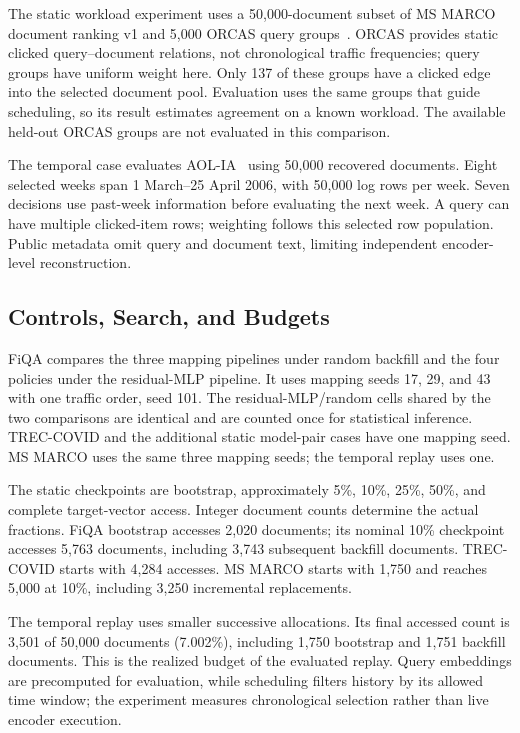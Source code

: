 \documentclass[runningheads]{llncs}
\begin{document}
The static workload experiment uses a 50,000-document subset of MS MARCO document ranking v1 and 5,000 ORCAS query groups~\cite{orcas}. ORCAS provides static clicked query--document relations, not chronological traffic frequencies; query groups have uniform weight here. Only 137 of these groups have a clicked edge into the selected document pool. Evaluation uses the same groups that guide scheduling, so its result estimates agreement on a known workload. The available held-out ORCAS groups are not evaluated in this comparison.

The temporal case evaluates AOL-IA~\cite{aol} using 50,000 recovered documents. Eight selected weeks span 1 March--25 April 2006, with 50,000 log rows per week. Seven decisions use past-week information before evaluating the next week. A query can have multiple clicked-item rows; weighting follows this selected row population. Public metadata omit query and document text, limiting independent encoder-level reconstruction.

\subsection{Controls, Search, and Budgets}

FiQA compares the three mapping pipelines under random backfill and the four policies under the residual-MLP pipeline. It uses mapping seeds 17, 29, and 43 with one traffic order, seed 101. The residual-MLP/random cells shared by the two comparisons are identical and are counted once for statistical inference. TREC-COVID and the additional static model-pair cases have one mapping seed. MS MARCO uses the same three mapping seeds; the temporal replay uses one.

The static checkpoints are bootstrap, approximately 5\%, 10\%, 25\%, 50\%, and complete target-vector access. Integer document counts determine the actual fractions. FiQA bootstrap accesses 2,020 documents; its nominal 10\% checkpoint accesses 5,763 documents, including 3,743 subsequent backfill documents. TREC-COVID starts with 4,284 accesses. MS MARCO starts with 1,750 and reaches 5,000 at 10\%, including 3,250 incremental replacements.

The temporal replay uses smaller successive allocations. Its final accessed count is 3,501 of 50,000 documents (7.002\%), including 1,750 bootstrap and 1,751 backfill documents. This is the realized budget of the evaluated replay. Query embeddings are precomputed for evaluation, while scheduling filters history by its allowed time window; the experiment measures chronological selection rather than live encoder execution.
\end{document}
